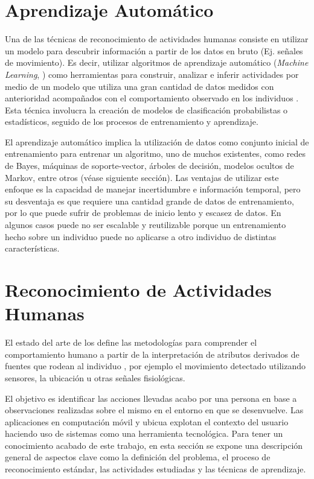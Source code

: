 \section{Aprendizaje Automático}

\label{sec25:aprendizaje-automatico}Una de las técnicas de reconocimiento
de actividades humanas consiste en utilizar un modelo para descubrir
información a partir de los datos en bruto (Ej. señales de movimiento).
Es decir, utilizar algoritmos de aprendizaje automático (\emph{Machine
Learning}, ) como herramientas para construir, analizar
e inferir actividades por medio de un modelo que utiliza una gran
cantidad de datos medidos con anterioridad acompañados con el comportamiento
observado en los individuos \cite{Chen2012}. Esta técnica involucra
la creación de modelos de clasificación probabilistas o estadísticos,
seguido de los procesos de entrenamiento y aprendizaje.

El aprendizaje automático implica la utilización de datos como conjunto
inicial de entrenamiento para entrenar un algoritmo, uno de muchos
existentes, como redes de Bayes, máquinas de soporte-vector, árboles
de decisión, modelos ocultos de Markov, entre otros \cite{Rajaraman2011}
(véase siguiente sección). Las ventajas de utilizar este enfoque es
la capacidad de manejar incertidumbre e información temporal, pero
su desventaja es que requiere una cantidad grande de datos de entrenamiento,
por lo que puede sufrir de problemas de inicio lento y escasez de
datos. En algunos casos puede no ser escalable y reutilizable porque
un entrenamiento hecho sobre un individuo puede no aplicarse a otro
individuo de distintas características.

\section{Reconocimiento de Actividades Humanas}

El estado del arte de los  define las metodologías para
comprender el comportamiento humano a partir de la interpretación
de atributos derivados de fuentes que rodean al individuo \cite{Bao2004,Poppe2007},
por ejemplo el movimiento detectado utilizando sensores, la ubicación
u otras señales fisiológicas. 

El objetivo es identificar las acciones llevadas acabo por una persona
en base a observaciones realizadas sobre el mismo en el entorno en
que se desenvuelve. Las aplicaciones en computación móvil y ubicua
explotan el contexto del usuario haciendo uso de sistemas 
como una herramienta tecnológica. Para tener un conocimiento acabado
de este trabajo, en esta sección se expone una descripción general
de aspectos clave como la definición del problema, el proceso de reconocimiento
estándar, las actividades estudiadas y las técnicas de aprendizaje.

